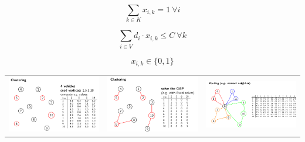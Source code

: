 \documentclass[]{article}
\begin{document}
\begin{equation} \label{GAP2}
 \sum_{k \in K} x_{i,k} = 1 \ \forall i
\end{equation}

\begin{equation} \label{GAP3}
\sum_{i \in V} d_{i}  \cdot x_{i,k} \leq C \ \forall k
\end{equation}

\begin{equation} \label{GAP4}
x_{i,k} \in \{0,1\}
\end{equation}


\begin{table}
	\begin{tabular}{c|c|c}
		\includegraphics[scale = 0.13]{images/CL-FJ-a} & 
		\includegraphics[scale = 0.13]{images/FJ_CL.png}  & 
		\includegraphics[scale = 0.13]{images/FJ_R.png}\\	

\end{tabular}
\end{table}
\end{document}
